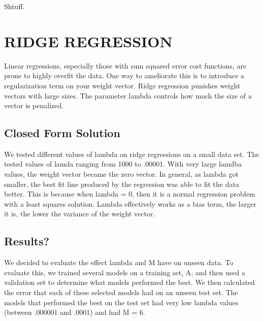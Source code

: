 \documentclass[a4paper,twoside]{article}
\begin{document}
Shtuff.


\section{\uppercase{Ridge Regression}}

Linear regressions, especially those with sum squared error cost functions, are prone to highly overfit the data. One way to ameliorate this is to introduce a regularization term on your weight vector. Ridge regression punishes weight vectors with large sizes. The parameter lambda controls how much the size of a vector is penalized. 

\subsection{Closed Form Solution}

We tested different values of lambda on ridge regressions on a small data set. The tested values of lamda ranging from 1000 to .00001. With very large lamdba values, the weight vector became the zero vector. In general, as lambda got smaller, the best fit line produced by the regression was able to fit the data better. This is because when lambda = 0, then it is a normal regression problem with a least squares solution. Lambda effectively works as a bias term, the larger it is, the lower the variance of the weight vector. 

\subsection{Results?}

We decided to evaluate the effect lambda and M have on unseen data. To evaluate this, we trained several models on a training set, A, and then used a validation set to determine what models performed the best. We then calculated the error that each of these selected models had on an unseen test set. The models that performed the best on the test set had very low lambda values (between .000001 and .0001) and had M = 6. 

\end{document}
